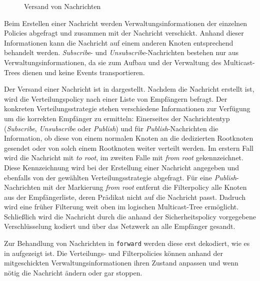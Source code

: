 \begin{figure}[htbp]
\centering
{}
\caption{Versand von Nachrichten}
\label{fig:processing_send}
\end{figure}

Beim Erstellen einer Nachricht werden Verwaltungsinformationen der einzelnen Policies abgefragt und zusammen mit der Nachricht verschickt. Anhand dieser Informationen kann die Nachricht auf einem anderen Knoten entsprechend behandelt werden. \emph{Subscribe}- und \emph{Unsubscribe}-Nachrichten bestehen nur aus Verwaltungsinformationen, da sie zum Aufbau und der Verwaltung des Multicast-Trees dienen und keine Events transportieren.

Der Versand einer Nachricht ist in  dargestellt. Nachdem die Nachricht erstellt ist, wird die Verteilungspolicy nach einer Liste von Empfängern befragt. Der konkreten Verteilungsstrategie stehen verschiedene Informationen zur Verfügung um die korrekten Empfänger zu ermitteln: Einerseites der Nachrichtentyp (\emph{Subscribe}, \emph{Unsubscribe} oder \emph{Publish}) und für \emph{Publish}-Nachrichten die Information, ob diese von einem normalen Knoten an die dedizierten Rootknoten gesendet oder von solch einem Rootknoten weiter verteilt werden. Im erstern Fall wird die Nachricht mit \emph{to root}, im zweiten Falle mit \emph{from root} gekennzeichnet. Diese Kennzeichnung wird bei der Erstellung einer Nachricht angegeben und ebenfalls von der gewählten Verteilungsstrategie abgefragt. Für eine \emph{Publish}-Nachrichten mit der Markierung \emph{from root} entfernt die Filterpolicy alle Knoten aus der Empfängerliste, deren Prädikat nicht auf die Nachricht passt. Dadruch wird eine früher Filterung weit oben im logischen Multicast-Tree ermöglicht.\\
Schließlich wird die Nachricht durch die anhand der Sicherheitspolicy vorgegebene Verschlüsselung kodiert und über das Netzwerk an alle Empfänger gesandt.

Zur Behandlung von Nachrichten in \texttt{forward} werden diese erst dekodiert, wie es in  aufgezeigt ist. Die Verteilungs- und Filterpolicies können anhand der mitgeschickten Verwaltungsinformationen ihren Zustand anpassen und wenn nötig die Nachricht ändern oder gar stoppen.

